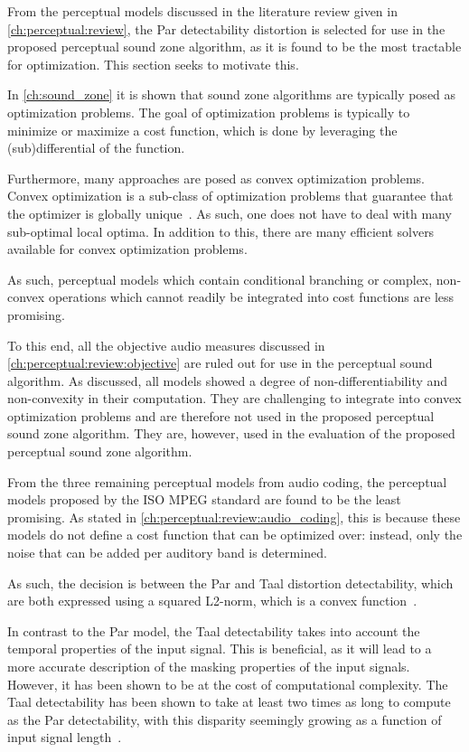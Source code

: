 From the perceptual models discussed in the literature review given in \autoref{ch:perceptual:review}, the Par detectability distortion is selected for use in the proposed perceptual sound zone algorithm, as it 
is found to be the most tractable for optimization.
This section seeks to motivate this.

In \autoref{ch:sound_zone} it is shown that sound zone algorithms are typically posed as optimization problems. 
The goal of optimization problems is typically to minimize or maximize a cost function, which is done by leveraging the (sub)differential of the function.

Furthermore, many approaches are posed as convex optimization problems.
Convex optimization is a sub-class of optimization problems that guarantee that the optimizer is globally unique~\cite{boyd2004convex}. 
As such, one does not have to deal with many sub-optimal local optima. 
In addition to this, there are many efficient solvers available for convex optimization problems.

As such, perceptual models which contain conditional branching or complex, non-convex operations which cannot readily 
be integrated into cost functions are less promising.

To this end, all the objective audio measures discussed in \autoref{ch:perceptual:review:objective} 
are ruled out for use in the perceptual sound algorithm. 
As discussed, all models showed a degree of non-differentiability and non-convexity in their computation.
They are challenging to integrate into convex optimization problems and are therefore not used in the proposed perceptual sound zone algorithm.
They are, however, used in the evaluation of the proposed perceptual sound zone algorithm.

From the three remaining perceptual models from audio coding, 
the perceptual models proposed by the ISO MPEG standard are found to be the least promising.
As stated in \autoref{ch:perceptual:review:audio_coding}, this is because these models do not define a cost function that can be optimized over: instead, only the noise that can be added per auditory band is determined.

As such, the decision is between the Par and Taal distortion detectability, which are both expressed using a  squared L2-norm, which is a convex function~\cite{boyd2004convex}.

In contrast to the Par model, the Taal detectability takes into account the temporal properties of the input signal.
This is beneficial, as it will lead to a more accurate description of the masking properties of the input signals.
However, it has been shown to be at the cost of computational complexity.
The Taal detectability has been shown to take at least two times as long to compute as the Par detectability, with this disparity seemingly growing as a function of input signal length~\cite{taal2012low}.

